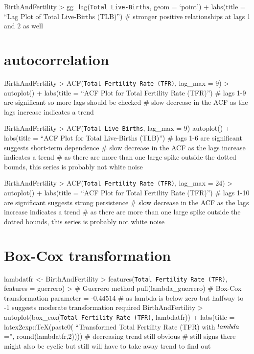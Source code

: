 \documentclass[
]{article}
\begin{document}
BirthAndFertility \textbar\textgreater{}
gg\_lag(\texttt{Total\ Live-Births}, geom = `point') + labs(title =
``Lag Plot of Total Live-Births (TLB)'') \# stronger positive
relationships at lags 1 and 2 as well

\section{autocorrelation}\label{autocorrelation}

BirthAndFertility \textbar\textgreater{}
ACF(\texttt{Total\ Fertility\ Rate\ (TFR)}, lag\_max = 9)
\textbar\textgreater{} autoplot() + labs(title = ``ACF Plot for Total
Fertility Rate (TFR)'') \# lags 1-9 are significant so more lags should
be checked \# slow decrease in the ACF as the lags increase indicates a
trend

BirthAndFertility \textbar\textgreater{}
ACF(\texttt{Total\ Live-Births}, lag\_max = 9) autoplot() + labs(title =
``ACF Plot for Total Live-Births (TLB)'') \# lags 1-6 are significant
suggests short-term dependence \# slow decrease in the ACF as the lags
increase indicates a trend \# as there are more than one large spike
outside the dotted bounds, this series is probably not white noise

BirthAndFertility \textbar\textgreater{}
ACF(\texttt{Total\ Fertility\ Rate\ (TFR)}, lag\_max = 24)
\textbar\textgreater{} autoplot() + labs(title = ``ACF Plot for Total
Fertility Rate (TFR)'') \# lags 1-10 are significant suggests strong
persistence \# slow decrease in the ACF as the lags increase indicates a
trend \# as there are more than one large spike outside the dotted
bounds, this series is probably not white noise

\section{Box-Cox transformation}\label{box-cox-transformation}

lambdatfr \textless- BirthAndFertility \textbar\textgreater{}
features(\texttt{Total\ Fertility\ Rate\ (TFR)}, features = guerrero)
\textbar\textgreater{} \# Guerrero method pull(lambda\_guerrero) \#
Box-Cox transformation parameter = -0.44514 \# as lambda is below zero
but halfway to -1 suggests moderate transformation required
BirthAndFertility \textbar\textgreater{}
autoplot(box\_cox(\texttt{Total\ Fertility\ Rate\ (TFR)}, lambdatfr)) +
labs(title = latex2exp::TeX(paste0( ``Transformed Total Fertility Rate
(TFR) with \(\\lambda\) ='', round(lambdatfr,2)))) \# decreasing trend
still obvious \# still signs there might also be cyclic but still will
have to take away trend to find out
\end{document}
